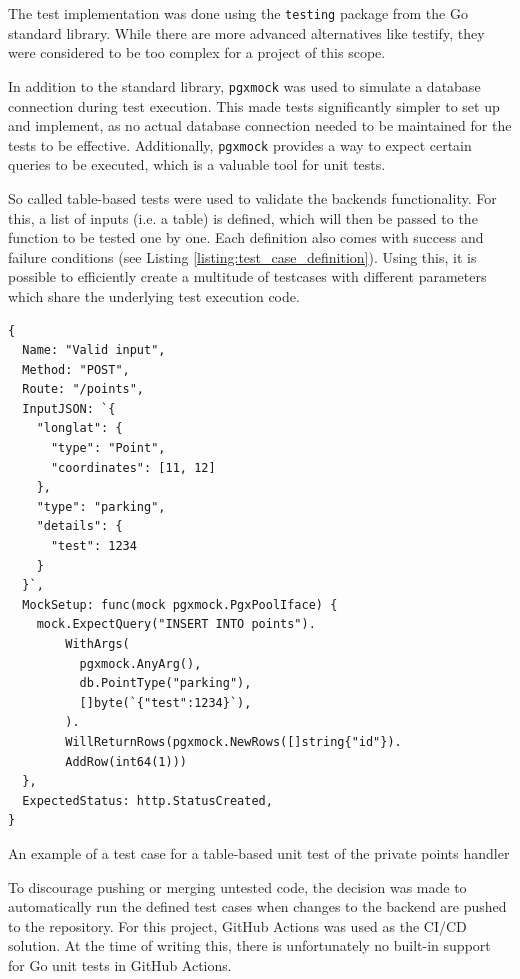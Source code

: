 The test implementation was done using the \texttt{testing} package from the Go
standard library. While there are more advanced alternatives like testify, they
were considered to be too complex for a project of this scope.

In addition to the standard library, \texttt{pgxmock} was used to simulate a
database connection during test execution. This made tests significantly simpler
to set up and implement, as no actual database connection needed to be
maintained for the tests to be effective. Additionally, \texttt{pgxmock}
provides a way to expect certain queries to be executed, which is a valuable
tool for unit tests.

So called table-based tests were used to validate the backends functionality.
For this, a list of inputs (i.e. a table) is defined, which will then be passed
to the function to be tested one by one. Each definition also comes with success
and failure conditions (see Listing \ref{listing:test_case_definition}). Using
this, it is possible to efficiently create a multitude of testcases with
different parameters which share the underlying test execution code.

\newpage{}

\begin{listing}[htbp]
  \centering{}
  \begin{minipage}{0.7\textwidth}
  \begin{verbatim}
{
  Name: "Valid input",
  Method: "POST",
  Route: "/points",
  InputJSON: `{
    "longlat": {
      "type": "Point",
      "coordinates": [11, 12]
    },
    "type": "parking",
    "details": {
      "test": 1234
    }
  }`,
  MockSetup: func(mock pgxmock.PgxPoolIface) {
    mock.ExpectQuery("INSERT INTO points").
        WithArgs(
          pgxmock.AnyArg(),
          db.PointType("parking"),
          []byte(`{"test":1234}`),
        ).
        WillReturnRows(pgxmock.NewRows([]string{"id"}).
        AddRow(int64(1)))
  },
  ExpectedStatus: http.StatusCreated,
}
  \end{verbatim}
  \end{minipage}
  \caption{An example of a test case for a table-based unit test of the private points handler}
  \label{listing:test_case_definition}
\end{listing}

To discourage pushing or merging untested code, the decision was made to
automatically run the defined test cases when changes to the backend are pushed
to the repository. For this project, GitHub Actions was used as the CI/CD
solution. At the time of writing this, there is unfortunately no built-in
support for Go unit tests in GitHub Actions.


